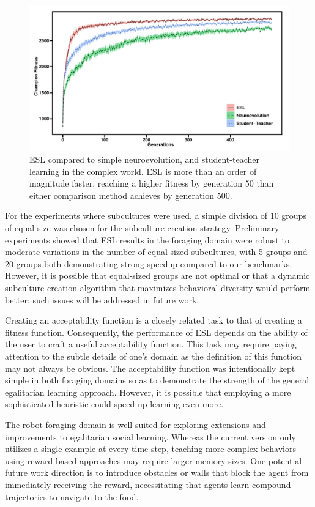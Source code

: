 \documentclass{sig-alternate}
\begin{document}
\begin{figure}[t]
  \centering
    \includegraphics[scale=.42]{egalitarian_vs_student_teacher_complex.pdf}
  \caption{ESL compared to simple neuroevolution, and student-teacher learning in the complex world.  ESL is more than an order of magnitude faster, reaching a higher fitness by generation 50 than either comparison method achieves by generation 500.}
  \label{fig:reward-studentteacher-complex}
\end{figure}

For the experiments where subcultures were used, a simple division of 10 groups of equal size was chosen for the subculture creation strategy. Preliminary experiments showed that ESL results in the foraging domain were robust to moderate variations in the number of equal-sized subcultures, with 5 groups and 20 groups both demonstrating strong speedup compared to our benchmarks. However, it is possible that equal-sized groups are not optimal or that a dynamic subculture creation algorithm that maximizes behavioral diversity would perform better; such issues will be addressed in future work.

Creating an acceptability function is a closely related task to that of creating a fitness function. Consequently, the performance of ESL depends on the ability of the user to craft a useful acceptability function. This task may require paying attention to the subtle details of one's domain as the definition of this function may not always be obvious. The acceptability function was intentionally kept simple in both foraging domains so as to demonstrate the strength of the general egalitarian learning approach. However, it is possible that employing a more sophisticated heuristic could speed up learning even more.

The robot foraging domain is well-suited for exploring extensions and improvements to egalitarian social learning. Whereas the current version only utilizes a single example at every time step, teaching more complex behaviors using reward-based approaches may require larger memory sizes. One potential future work direction is to introduce obstacles or walls that block the agent from immediately receiving the reward, necessitating that agents learn compound trajectories to navigate to the food.
\end{document}
